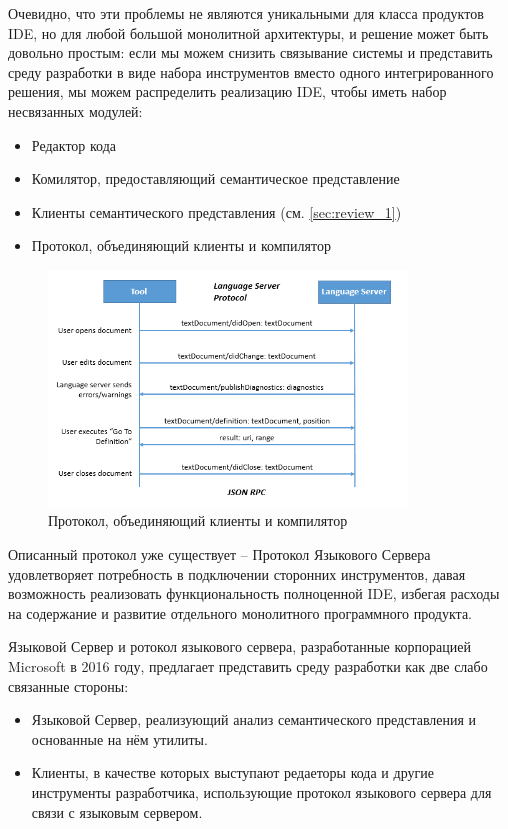 Очевидно, что эти проблемы не являются уникальными для класса продуктов IDE, но для любой большой монолитной архитектуры, 
и решение может быть довольно простым: если мы можем снизить связывание системы и представить среду разработки в виде набора инструментов 
вместо одного интегрированного решения, мы можем распределить реализацию IDE, чтобы иметь набор несвязанных модулей:
\begin{itemize}
    \item Редактор кода
    \item Комилятор, предоставляющий семантическое представление
    \item Клиенты семантического представления (см. \ref{sec:review_1})
    \item Протокол, объединяющий клиенты и компилятор
\end{itemize}
\newpage

\begin{figure}[H]
    \centering
    \includegraphics[width=0.85\textwidth]{figs/lsp.png}
    \caption{Протокол, объединяющий клиенты и компилятор}
\end{figure}

Описанный протокол уже существует -- Протокол Языкового Сервера удовлетворяет потребность в подключении сторонних инструментов, давая возможность
реализовать функциональность полноценной IDE, избегая расходы на содержание и развитие отдельного монолитного программного продукта.

Языковой Сервер и ротокол языкового сервера, разработанные корпорацией Microsoft в 2016 году, предлагает представить среду разработки как две слабо связанные стороны:
\begin{itemize}
    \item Языковой Сервер, реализующий анализ семантического представления и основанные на нём утилиты.
    \item Клиенты, в качестве которых выступают редаеторы кода и другие инструменты разработчика, использующие протокол языкового сервера для связи с языковым сервером\cite{Sourcegraph}.
\end{itemize}

